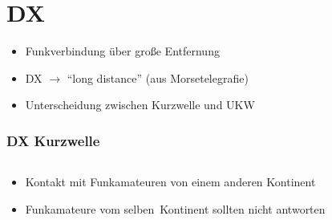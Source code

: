 
\section{DX}
\label{section:dx}
\begin{frame}%
\begin{itemize}
  \item Funkverbindung über große Entfernung
  \item DX $\rightarrow$ \enquote{long distance} (aus Morsetelegrafie)
  \item Unterscheidung zwischen Kurzwelle und UKW
  \end{itemize}
\end{frame}

\begin{frame}
\frametitle{DX Kurzwelle}
\begin{columns}
    \begin{column}{0.48\textwidth}
    \begin{itemize}
  \item Kontakt mit Funkamateuren von einem anderen Kontinent
  \item Funkamateure vom selben Kontinent sollten nicht antworten
  \end{itemize}

    \end{column}
   \begin{column}{0.48\textwidth}
       
    \pause{}



   \end{column}
\end{columns}

\end{frame}

\begin{frame}
\end{frame}

